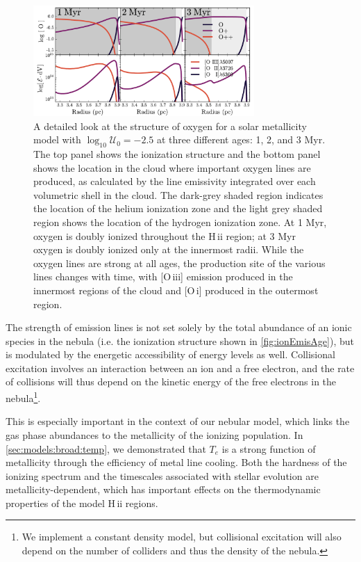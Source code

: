 \documentclass[twocolumn, tighten]{aastex61}
\newcommand{\Fig}[1]{\autoref{fig:#1}}
\newcommand{\Sec}[1]{\autoref{sec:#1}}
\newcommand{\logten}{\ensuremath{\log_{10}}}
\newcommand{\Te}{\ensuremath{T_{e}}}
\newcommand{\oiii}{[O\,{\sc iii}]\xspace}
\newcommand{\oi}{[O\,{\sc i}]\xspace}
\newcommand{\hii}{H\,{\sc ii}\xspace}
\newcommand{\logU}{\ensuremath{\logten \mathcal{U}_0}}
\begin{document}
\begin{figure}
  \begin{centering}
    \includegraphics[width=0.75\textwidth]{f7.pdf}
    \caption{A detailed look at the structure of oxygen for a solar metallicity model with $\logU = -2.5$ at three different ages: 1, 2, and 3 Myr. The top panel shows the ionization structure and the bottom panel shows the location in the cloud where important oxygen lines are produced, as calculated by the line emissivity integrated over each volumetric shell in the cloud. The dark-grey shaded region indicates the location of the helium ionization zone and the light grey shaded region shows the location of the hydrogen ionization zone. At 1 Myr, oxygen is doubly ionized throughout the \hii region; at 3 Myr oxygen is doubly ionized only at the innermost radii. While the oxygen lines are strong at all ages, the production site of the various lines changes with time, with \oiii{} emission produced in the innermost regions of the cloud and \oi{} produced in the outermost region.}
    \label{fig:ionEmisAge}
  \end{centering}
\end{figure}

The strength of emission lines is not set solely by the total abundance of an ionic species in the nebula (i.e. the ionization structure shown in \Fig{ionEmisAge}), but is modulated by the energetic accessibility of energy levels as well. Collisional excitation involves an interaction between an ion and a free electron, and the rate of collisions will thus depend on the kinetic energy of the free electrons in the nebula\footnote{We implement a constant density model, but collisional excitation will also depend on the number of colliders and thus the density of the nebula.}.

This is especially important in the context of our nebular model, which links the gas phase abundances to the metallicity of the ionizing population. In \Sec{models:broad:temp}, we demonstrated that \Te{} is a strong function of metallicity through the efficiency of metal line cooling. Both the hardness of the ionizing spectrum and the timescales associated with stellar evolution are metallicity-dependent, which has important effects on the thermodynamic properties of the model \hii regions.
\end{document}
